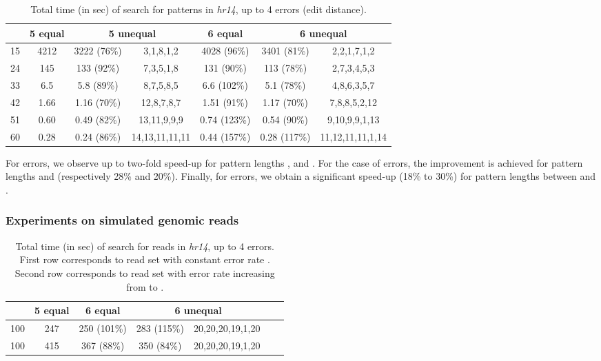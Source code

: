 \documentclass[12pt]{article}
\begin{document}
\begin{table}[!tb]
\caption{Total time (in sec) of search for  patterns
in \emph{hr14}, up to 4 errors (edit distance).
\label{tab:times4edit}}
\centering
\begin{tabular}{|c|c|c|c|c|c|c|}
\hline
 & 5 equal & \multicolumn{2}{|c|}{5 unequal} & 6 equal & \multicolumn{2}{|c|}{6 unequal} \\
\hline
15 & 4212 & 3222 (76\%)  & 3,1,8,1,2 & 4028 (96\%) & 3401 (81\%) & 2,2,1,7,1,2 \\
24 & 145 & 133 (92\%)  & 7,3,5,1,8 & 131 (90\%) & 113 (78\%) & 2,7,3,4,5,3 \\
33 & 6.5  & 5.8 (89\%)   & 8,7,5,8,5 & 6.6 (102\%)  & 5.1 (78\%) & 4,8,6,3,5,7 \\
42 & 1.66  & 1.16 (70\%)  & 12,8,7,8,7 & 1.51 (91\%)  & 1.17 (70\%) & 7,8,8,5,2,12 \\
51 & 0.60  & 0.49 (82\%)  & 13,11,9,9,9 & 0.74 (123\%)  & 0.54 (90\%) & 9,10,9,9,1,13 \\
60 & 0.28  & 0.24 (86\%)  & 14,13,11,11,11 & 0.44 (157\%)  & 0.28 (117\%) & 11,12,11,11,1,14 \\
\hline
\end{tabular}
\end{table}

For  errors, we observe up to two-fold speed-up for pattern lengths
,  and . For the case of 
errors, the improvement is achieved for pattern lengths  and 
(respectively 28\% and 20\%). Finally, for  errors, we obtain a significant speed-up (18\%
to 30\%) for pattern lengths between  and .




\subsubsection{Experiments on simulated 
genomic
  reads}\label{subsubsec:experimentgenomic}

\begin{table}[!tb]
\caption{Total time (in sec) 
of search for  reads in \emph{hr14}, up to 4 errors.
First row corresponds to read set with constant error rate .
Second row corresponds to read set with error rate increasing from  to .
\label{tab:expgenomic}}
\centering
\begin{tabular}{|c|c|c|c|c|c|c|}
\hline
 & 5 equal & 6 equal & \multicolumn{2}{|c|}{6 unequal} \\
\hline
100 & 247  & 250 (101\%)  & 283 (115\%) & 20,20,20,19,1,20 \\
100 & 415  & 367 (88\%)  & 350 (84\%) & 20,20,20,19,1,20 \\
\hline
\end{tabular}
\end{table}
\end{document}
